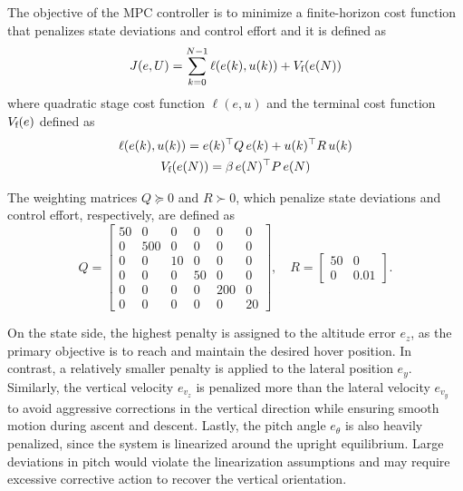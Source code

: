 \documentclass[10pt,twocolumn,twoside]{IEEEtran}
\begin{document}
The objective of the MPC controller is to minimize a finite-horizon cost function that penalizes state deviations and control effort and it is defined as
\begin{equation}
    J(e, U) = \sum_{k=0}^{N-1} \ell(e(k), u(k)) + V_{\textup{f}}(e(N))
    \label{eq:2.11}
\end{equation}
where quadratic stage cost function $\ell(e, u)$ and the terminal cost function $V_{\textup{f}}(e)$ defined as
\begin{equation}
    \begin{gathered}
        \ell(e(k), u(k)) = e(k)^\top Q\, e(k) + u(k)^\top R\, u(k)\\
        V_{\textup{f}}(e(N)) = \beta\, e(N)^\top P\, e(N)
    \end{gathered}
    \label{eq:2.12}
\end{equation}

The weighting matrices $Q \succeq 0$ and $R \succ 0$, which penalize state deviations and control effort, respectively, are defined as
\begin{equation}
    Q =
    \begin{bmatrix}
    50 & 0 & 0 & 0 & 0 & 0 \\
    0 & 500 & 0 & 0 & 0 & 0 \\
    0 & 0 & 10 & 0 & 0 & 0 \\
    0 & 0 & 0 & 50 & 0 & 0 \\
    0 & 0 & 0 & 0 & 200 & 0 \\
    0 & 0 & 0 & 0 & 0 & 20
    \end{bmatrix}, \quad
    R =
    \begin{bmatrix}
    50 & 0 \\
    0 & 0.01
    \end{bmatrix}.
\end{equation}

On the state side, the highest penalty is assigned to the altitude error $e_z$, as the primary objective is to reach and maintain the desired hover position. In contrast, a relatively smaller penalty is applied to the lateral position $e_y$. Similarly, the vertical velocity $e_{v_z}$ is penalized more than the lateral velocity $e_{v_y}$ to avoid aggressive corrections in the vertical direction while ensuring smooth motion during ascent and descent. Lastly, the pitch angle $e_\theta$ is also heavily penalized, since the system is linearized around the upright equilibrium. Large deviations in pitch would violate the linearization assumptions and may require excessive corrective action to recover the vertical orientation.
\end{document}
